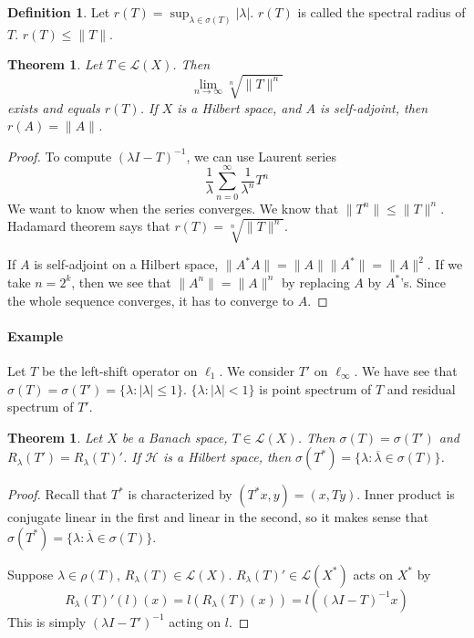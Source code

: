 \documentclass[12pt]{article}
\theoremstyle{plain}
\newtheorem{theorem}[equation]{Theorem}
\theoremstyle{definition}
\newtheorem{definition}[equation]{Definition}
\theoremstyle{named}
\newcommand{\shH}{\mathscr{H}}
\newcommand{\shL}{\mathscr{L}}
\newcommand{\<}{\langle}
\renewcommand{\>}{\rangle}
\begin{document}
\begin{definition}
Let $r(T) = \sup_{\lambda \in \sigma(T)} |\lambda|$. $r(T)$ is called the spectral radius of $T$. $r(T) \le \| T \|$. 
\end{definition}

\begin{theorem}
Let $T \in \shL(X)$. Then $$\lim_{n \to \infty} \sqrt[n]{\| T \|^n }$$ exists and equals $r(T)$. If $X$ is a Hilbert space, and $A$ is self-adjoint, then $r(A) = \| A \|$. 
\end{theorem}
\begin{proof}
To compute $(\lambda I - T)^{-1}$, we can use Laurent series
$$ \frac{1}{\lambda} \sum_{n = 0}^\infty \frac{1}{\lambda^n} T^n $$
We want to know when the series converges. We know that $\| T^n \| \le \| T \|^n$. Hadamard theorem says that $r(T) = \sqrt[n]{\| T \|^n}$.

If $A$ is self-adjoint on a Hilbert space, $\| A^* A \| = \| A \| \| A^* \| = \| A \|^2$. If we take $n = 2^k$, then we see that $\| A^n \| = \| A \|^n$ by replacing $A$ by $A^*$'s. Since the whole sequence converges, it has to converge to $A$. 
\end{proof}

\paragraph{Example} Let $T$ be the left-shift operator on $\ell_1$. We consider $T'$ on $\ell_\infty$. We have see that $\sigma(T) = \sigma(T') = \{ \lambda : |\lambda| \le 1 \}$. $\{ \lambda : |\lambda| < 1 \}$ is point spectrum of $T$ and residual spectrum of $T'$. 

\begin{theorem}
Let $X$ be a Banach space, $T \in \shL(X)$. Then $\sigma(T) = \sigma(T')$ and $R_\lambda(T') = R_\lambda(T)'$. If $\shH$ is a Hilbert space, then $\sigma(T^*) = \{ \lambda : \overline{\lambda} \in \sigma(T) \}$. 
\end{theorem}
\begin{proof}
Recall that $T^*$ is characterized by $(T^* x, y) = (x, Ty)$. Inner product is conjugate linear in the first and linear in the second, so it makes sense that $\sigma(T^*) = \{ \lambda : \overline{\lambda} \in \sigma(T) \}$. 

Suppose $\lambda \in \rho(T)$, $R_\lambda(T) \in \shL(X)$. $R_\lambda(T)' \in \shL(X^*)$ acts on $X^*$ by 
$$ R_\lambda(T)'(l)(x) = l(R_\lambda(T)(x)) = l((\lambda I - T)^{-1} x) $$
This is simply $(\lambda I - T')^{-1}$ acting on $l$. 
\end{proof}
\end{document}
